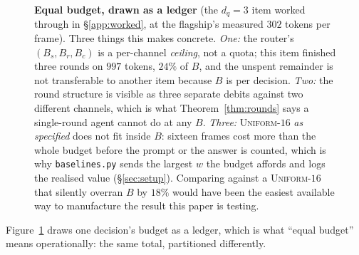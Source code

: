\documentclass[10pt]{article}
\theoremstyle{definition}
\theoremstyle{plain}
\newcommand{\cs}{\mathcal{C}_{\mathrm{s}}}
\newcommand{\cv}{\mathcal{C}_{\mathrm{v}}}
\begin{document}
\begin{figure}[!t]
\caption{\textbf{Equal budget, drawn as a ledger} (the $d_q{=}3$ item worked through in
\S\ref{app:worked}, at the flagship's measured $302$ tokens per frame). Three things this makes
concrete. \emph{One:} the router's $(B_s,B_r,B_c)$ is a per-channel \emph{ceiling}, not a quota; this item finished three rounds on $997$ tokens, $24\%$ of $B$, and the unspent remainder is
not transferable to another item because $B$ is per decision. \emph{Two:} the round structure is
visible as three separate debits against two different channels, which is what
Theorem~\ref{thm:rounds} says a single-round agent cannot do at any $B$. \emph{Three:}
\textsc{Uniform-}$16$ \emph{as specified} does not fit inside $B$: sixteen frames cost more than
the whole budget before the prompt or the answer is counted, which is why \texttt{baselines.py}
sends the largest $w$ the budget affords and logs the realised value (\S\ref{sec:setup}).
Comparing against a \textsc{Uniform-}$16$ that silently overran $B$ by $18\%$ would have been the
easiest available way to manufacture the result this paper is testing.}
\label{fig:ledger}
\end{figure}

Figure~\ref{fig:ledger} draws one decision's budget as a ledger, which is what ``equal budget'' means operationally: the same total, partitioned differently.
\end{document}
